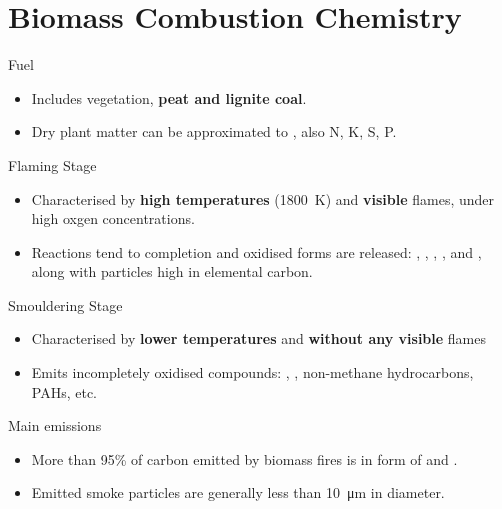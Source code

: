 \documentclass[
11pt,notheorems,hyperref={pdfauthor=whatever}
]{beamer}
\begin{document}
\section{Biomass Combustion Chemistry}
\begin{frame}
    \begin{block}{Fuel}
        \begin{itemize}
            \item Includes vegetation, \textbf{peat and lignite coal}.
            \item Dry plant matter can be approximated to , also N, K, S, P.
        \end{itemize}
    \end{block}


    \begin{block}{Flaming Stage}
        \begin{itemize}
            \item Characterised by \textbf{high temperatures} (\qty{1800}{\kelvin}) and \textbf{visible} flames, under high oxgen concentrations.
            \item Reactions tend to completion and oxidised forms are released: , , , , and , along with particles high in elemental carbon. 
        \end{itemize}
    \end{block}

    \begin{block}{Smouldering Stage}
        \begin{itemize}
            \item Characterised by \textbf{lower temperatures} and \textbf{without any visible} flames
            \item Emits incompletely oxidised compounds: , , non-methane hydrocarbons, PAHs, etc.
        \end{itemize}
    \end{block}

    \begin{block}{Main emissions}
        \begin{itemize}
            \item More than 95\% of carbon emitted by biomass fires is in form of  and .
            \item Emitted smoke particles are generally less than \qty{10}{\micro\metre} in diameter.
        \end{itemize}        
    \end{block}
\end{frame}
\end{document}
